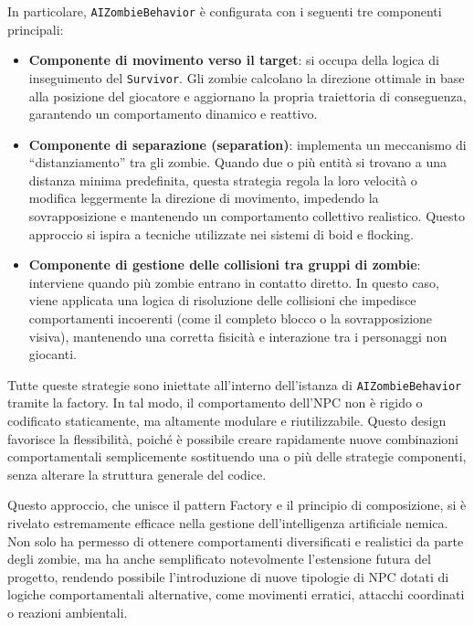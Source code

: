 \documentclass[a4paper,12pt]{report}
\begin{document}
In particolare, \texttt{AIZombieBehavior} è configurata con i seguenti tre componenti principali:

\begin{itemize}
    \item \textbf{Componente di movimento verso il target}: si occupa della logica di inseguimento del \texttt{Survivor}. Gli zombie calcolano la direzione ottimale in base alla posizione del giocatore e aggiornano la propria traiettoria di conseguenza, garantendo un comportamento dinamico e reattivo.

    \item \textbf{Componente di separazione (separation)}: implementa un meccanismo di “distanziamento” tra gli zombie. Quando due o più entità si trovano a una distanza minima predefinita, questa strategia regola la loro velocità o modifica leggermente la direzione di movimento, impedendo la sovrapposizione e mantenendo un comportamento collettivo realistico. Questo approccio si ispira a tecniche utilizzate nei sistemi di boid e flocking.

    \item \textbf{Componente di gestione delle collisioni tra gruppi di zombie}: interviene quando più zombie entrano in contatto diretto. In questo caso, viene applicata una logica di risoluzione delle collisioni che impedisce comportamenti incoerenti (come il completo blocco o la sovrapposizione visiva), mantenendo una corretta fisicità e interazione tra i personaggi non giocanti.
\end{itemize}

Tutte queste strategie sono iniettate all’interno dell’istanza di \texttt{AIZombieBehavior} tramite la factory. In tal modo, il comportamento dell’NPC non è rigido o codificato staticamente, ma altamente modulare e riutilizzabile. Questo design favorisce la flessibilità, poiché è possibile creare rapidamente nuove combinazioni comportamentali semplicemente sostituendo una o più delle strategie componenti, senza alterare la struttura generale del codice.

\bigskip

Questo approccio, che unisce il pattern Factory e il principio di composizione, si è rivelato estremamente efficace nella gestione dell'intelligenza artificiale nemica. Non solo ha permesso di ottenere comportamenti diversificati e realistici da parte degli zombie, ma ha anche semplificato notevolmente l'estensione futura del progetto, rendendo possibile l'introduzione di nuove tipologie di NPC dotati di logiche comportamentali alternative, come movimenti erratici, attacchi coordinati o reazioni ambientali.
\end{document}
